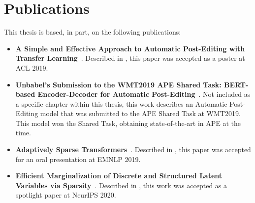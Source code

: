 \section{Publications}
\label{sec:int_publications}

This thesis is based, in part, on the following publications:

\begin{sloppypar}
      \begin{itemize}

            \item {\bf A Simple and Effective Approach to Automatic
                  Post-Editing with Transfer Learning}~\citep{Correia2019}.
                  Described in , this paper was accepted as a
                  poster at ACL 2019.
                  
            \item {\bf Unbabel's Submission to the WMT2019 APE Shared Task:
                  BERT-based Encoder-Decoder for Automatic
                  Post-Editing}~\citep{lopes2019unbabels}. Not included as a specific
                  chapter within this thesis, this work describes an Automatic
                  Post-Editing model that was submitted to the APE Shared Task at
                  WMT2019. This model won the Shared Task, obtaining state-of-the-art
                  in APE at the time.
                  
            \item {\bf Adaptively Sparse
                  Transformers}~\citep{correia2019adaptively}. Described in
                  , this paper was accepted for an oral
                  presentation at EMNLP 2019.
                  
            \item {\bf Efficient Marginalization of Discrete and Structured
                  Latent Variables via Sparsity}~\citep{correia2020procneurips}.
                  Described in , this work was
                  accepted as a spotlight paper at NeurIPS 2020.
                  
      \end{itemize}
\end{sloppypar}